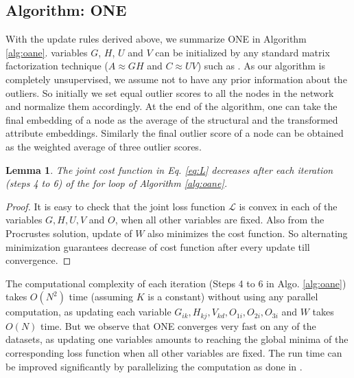 \documentclass[letterpaper]{article} %
\newtheorem{proof}{Proof}
\newtheorem{lemma}{Lemma}
\begin{document}
\subsection{Algorithm: ONE}\label{sec:algOne}
With the update rules derived above, we summarize ONE in Algorithm \ref{alg:oane}. variables $G$, $H$, $U$ and $V$ can be initialized by any standard matrix factorization technique ($A \approx GH$ and $C \approx UV$) such as \cite{lee2001algorithms}. As our algorithm is completely unsupervised, we assume not to have any prior information about the outliers. So initially we set equal outlier scores to all the nodes in the network and normalize them accordingly. At the end of the algorithm, one can take the final embedding of a node as the average of the structural and the transformed attribute embeddings. Similarly the final outlier score of a node can be obtained as the weighted average of three outlier scores. 

\begin{lemma}
The joint cost function in Eq. \ref{eq:L} decreases after each iteration (steps 4 to 6) of the for loop of Algorithm \ref{alg:oane}.
\end{lemma}
\begin{proof}
It is easy to check that the joint loss function $\mathcal{L}$ is convex in each of the variables $G,H,U,V$ and $O$, when all other variables are fixed. Also from the Procrustes solution, update of $W$ also minimizes the cost function. So alternating minimization guarantees decrease of cost function after every update till convergence.
\end{proof}

The computational complexity of each iteration (Steps 4 to 6 in Algo. \ref{alg:oane}) takes $O(N^2)$ time (assuming $K$ is a constant) without using any parallel computation, as updating each variable $G_{ik}, H_{kj}, V_{kd}, O_{1i}, O_{2i}, O_{3i}$ and $W$ takes $O(N)$ time. But we observe that ONE converges very fast on any of the datasets, as updating one variables amounts to reaching the global minima of the corresponding loss function when all other variables are fixed. The run time can be improved significantly by parallelizing the computation as done in \cite{huang2017accelerated}.
\end{document}
